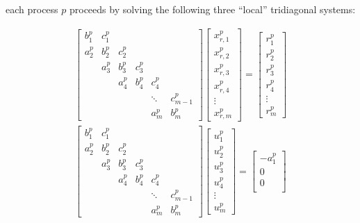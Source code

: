 \documentclass{elsarticle}
\begin{document}
each process $p$ proceeds by solving the following three ``local''
tridiagonal systems:

\begin{align}
& \begin{bmatrix}
b_1^p & c_1^p \\
a_2^p & b_2^p & c_2^p \\
      & a_3^p & b_3^p & c_3^p \\
      &       & a_4^p & b_4^p & c_4^p \\
      &       &       &       &  \ddots & c_{m-1}^p\\
      &       &       &       &     a_{m}^p  & b_{m}^p
\end{bmatrix}
\begin{bmatrix}
x_{r,1}^p \\
x_{r,2}^p \\
x_{r,3}^p \\
x_{r,4}^p \\
\vdots \\
x_{r,m}^p
\end{bmatrix}
=
\begin{bmatrix}
r_1^p \\
r_2^p \\
r_3^p \\
r_4^p \\
\vdots \\
r_m^p
\end{bmatrix} & \label{eqn:primary-system} \\
%
%
%
& \begin{bmatrix}
b_1^p & c_1^p \\
a_2^p & b_2^p & c_2^p \\
      & a_3^p & b_3^p & c_3^p \\
      &       & a_4^p & b_4^p & c_4^p \\
      &       &       &       &  \ddots & c_{m-1}^p\\
      &       &       &       &     a_{m}^p  & b_{m}^p
\end{bmatrix}
\begin{bmatrix}
u_1^p \\
u_2^p \\
u_3^p \\
u_4^p \\
\vdots \\
u_m^p
\end{bmatrix}
=
\begin{bmatrix}
-a_1^p \\
0 \\
0 \\

\end{bmatrix}
\end{align}
\end{document}
